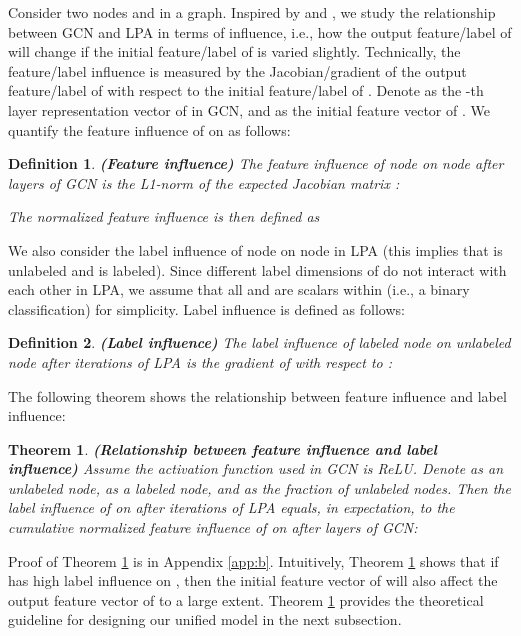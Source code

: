 \documentclass{article}
\newtheorem{theorem}{Theorem}
\newtheorem{definition}{Definition}
\begin{document}
		Consider two nodes  and  in a graph.
		Inspired by \cite{koh2017understanding} and \cite{xu2018representation}, we study the relationship between GCN and LPA in terms of influence, i.e., how the output feature/label of  will change if the initial feature/label of  is varied slightly.
		Technically, the feature/label influence is measured by the Jacobian/gradient of the output feature/label of  with respect to the initial feature/label of .
		Denote  as the -th layer representation vector of  in GCN, and  as the initial feature vector of .
		We quantify the feature influence of  on  as follows:
		
		\begin{definition}
			\rm\textbf{(Feature influence)}
			The feature influence of node  on node  after  layers of GCN is the L1-norm of the expected Jacobian matrix :
			
			The normalized feature influence is then defined as
			
		\end{definition}
		
		We also consider the label influence of node  on node  in LPA (this implies that  is unlabeled and  is labeled).
		Since different label dimensions of  do not interact with each other in LPA, we assume that all  and  are scalars within  (i.e., a binary classification) for simplicity.
		Label influence is defined as follows:
		
		\begin{definition}
			\rm\textbf{(Label influence)}
			The label influence of labeled node  on unlabeled node  after  iterations of LPA is the gradient of  with respect to :
			
			
		\end{definition}
		
		The following theorem shows the relationship between feature influence and label influence:
		
		\begin{theorem}
		\label{thm:influence}
			\rm\textbf{(Relationship between feature influence and label influence)}
			Assume the activation function used in GCN is ReLU.
			Denote  as an unlabeled node,  as a labeled node, and  as the fraction of unlabeled nodes.
			Then the label influence of  on  after  iterations of LPA equals, in expectation, to the cumulative normalized feature influence of  on  after  layers of GCN:
			
		\end{theorem}
		
		Proof of Theorem \ref{thm:influence} is in Appendix \ref{app:b}.
		Intuitively, Theorem \ref{thm:influence} shows that if  has high label influence on , then the initial feature vector of  will also affect the output feature vector of  to a large extent.
		Theorem \ref{thm:influence} provides the theoretical guideline for designing our unified model in the next subsection.
		
\end{document}
